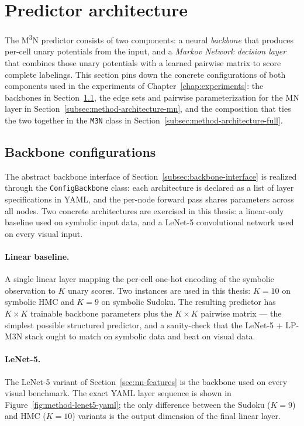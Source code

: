\section{Predictor architecture}
\label{sec:method-architecture}

The M\textsuperscript{3}N predictor consists of two components:
a neural \emph{backbone} that produces per-cell unary
potentials from the input, and a \emph{Markov Network decision
layer} that combines those unary potentials with a learned
pairwise matrix to score complete labelings. This section
pins down the concrete configurations of both components used
in the experiments of Chapter~\ref{chap:experiments}: the
backbones in
Section~\ref{subsec:method-architecture-backbones}, the edge
sets and pairwise parameterization for the MN layer in
Section~\ref{subsec:method-architecture-mn}, and the
composition that ties the two together in the \texttt{M3N}
class in Section~\ref{subsec:method-architecture-full}.

\subsection{Backbone configurations}
\label{subsec:method-architecture-backbones}

The abstract backbone interface of
Section~\ref{subsec:backbone-interface} is realized through the
\texttt{ConfigBackbone} class: each architecture is declared as a
list of layer specifications in YAML, and the per-node forward
pass shares parameters across all nodes. Two concrete architectures are exercised in this
thesis: a linear-only baseline used on symbolic input data,
and a LeNet-5 convolutional network used on every visual
input.

\paragraph{Linear baseline.}
A single linear layer mapping the per-cell one-hot encoding of
the symbolic observation to $K$ unary scores. Two instances are
used in this thesis: $K = 10$ on symbolic HMC and $K = 9$ on
symbolic Sudoku. The resulting predictor has $K \times K$
trainable backbone parameters plus the $K \times K$ pairwise
matrix --- the simplest possible structured predictor, and a
sanity-check that the LeNet-5 + LP-M3N stack ought to match on
symbolic data and beat on visual data.

\paragraph{LeNet-5.}
The LeNet-5 variant of Section~\ref{sec:nn-features} is the
backbone used on every visual benchmark. The exact YAML layer
sequence is shown in Figure~\ref{fig:method-lenet5-yaml}; the only
difference between the Sudoku ($K = 9$) and HMC ($K = 10$)
variants is the output dimension of the final linear layer.

